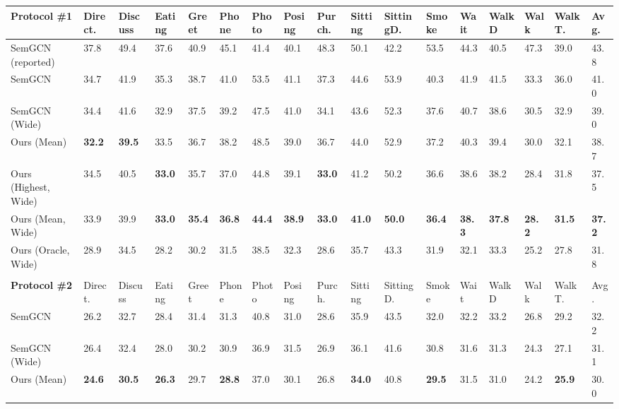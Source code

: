 \begin{table}
\scriptsize
\setlength{\tabcolsep}{1pt}
\begin{tabular}{lllllllllllllllll}
\noalign{\smallskip}
\textbf{Protocol   \#1} & Direct. & Discuss & Eating & Greet & Phone & Photo & Posing & Purch. & Sitting & SittingD. & Smoke & Wait & WalkD & Walk & WalkT. & Avg. \\ \hline
SemGCN (reported)\cite{Zhao_2019_CVPR} & 37.8 & 49.4 & 37.6 & 40.9 & 45.1 & 41.4 & 40.1 & 48.3 & 50.1 & 42.2 & 53.5 & 44.3 & 40.5 & 47.3 & 39.0 & 43.8 \\
SemGCN & 34.7 & 41.9 & 35.3 & 38.7 & 41.0 & 53.5 & 41.1 & 37.3 & 44.6 & 53.9 & 40.3 & 41.9 & 41.5 & 33.3 & 36.0 & 41.0 \\
SemGCN (Wide) & 34.4 & 41.6 & 32.9 & 37.5 & 39.2 & 47.5 & 41.0 & 34.1 & 43.6 & 52.3 & 37.6 & 40.7 & 38.6 & 30.5 & 32.9 & 39.0 \\
Ours (Mean) & \textbf{32.2} & \textbf{39.5} & 33.5 & 36.7 & 38.2 & 48.5 & 39.0 & 36.7 & 44.0 & 52.9 & 37.2 & 40.3 & 39.4 & 30.0 & 32.1 & 38.7 \\
Ours (Highest, Wide) & 34.5 & 40.5 & \textbf{33.0} & 35.7 & 37.0 & 44.8 & 39.1 & \textbf{33.0} & 41.2 & 50.2 & 36.6 & 38.6 & 38.2 & 28.4 & 31.8 & 37.5 \\
Ours (Mean, Wide) & 33.9 & 39.9 & \textbf{33.0} & \textbf{35.4} & \textbf{36.8} & \textbf{44.4} & \textbf{38.9} & \textbf{33.0} & \textbf{41.0} & \textbf{50.0} & \textbf{36.4} & \textbf{38.3} & \textbf{37.8} & \textbf{28.2} & \textbf{31.5} & \textbf{37.2} \\ \hline
Ours (Oracle, Wide) & 28.9 & 34.5 & 28.2 & 30.2 & 31.5 & 38.5 & 32.3 & 28.6 & 35.7 & 43.3 & 31.9 & 32.1 & 33.3 & 25.2 & 27.8 & 31.8 \\
 &  &  &  &  &  &  &  &  &  &  &  &  &  &  &  &  \\
\textbf{Protocol \#2} & Direct. & Discuss & Eating & Greet & Phone & Photo & Posing & Purch. & Sitting & SittingD. & Smoke & Wait & WalkD & Walk & WalkT. & Avg. \\ \hline
SemGCN & 26.2 & 32.7 & 28.4 & 31.4 & 31.3 & 40.8 & 31.0 & 28.6 & 35.9 & 43.5 & 32.0 & 32.2 & 33.2 & 26.8 & 29.2 & 32.2 \\
SemGCN (Wide) & 26.4 & 32.4 & 28.0 & 30.2 & 30.9 & 36.9 & 31.5 & 26.9 & 36.1 & 41.6 & 30.8 & 31.6 & 31.3 & 24.3 & 27.1 & 31.1 \\
Ours (Mean) & \textbf{24.6} & \textbf{30.5} & \textbf{26.3} & 29.7 & \textbf{28.8} & 37.0 & 30.1 & 26.8 & \textbf{34.0} & 40.8 & \textbf{29.5} & 31.5 & 31.0 & 24.2 & \textbf{25.9} & 30.0 \\

\end{tabular}
\end{table}
